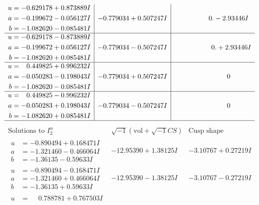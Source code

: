 \documentclass[1p]{elsarticle_modified}
\theoremstyle{definition}
\newcommand{\I}{\sqrt{-1}}
\begin{document}
$$\begin{array}{c|c|c}
\begin{aligned}
u &= -0.629178 + 0.873889 I \\
a &= -0.199672 - 0.056127 I \\
b &= -1.082620 - 0.085481 I\end{aligned}
 & -0.779034 + 0.507247 I & \phantom{-0.000000 } 0. - 2.93446 I \\ \hline\begin{aligned}
u &= -0.629178 - 0.873889 I \\
a &= -0.199672 + 0.056127 I \\
b &= -1.082620 + 0.085481 I\end{aligned}
 & -0.779034 - 0.507247 I & \phantom{-0.000000 -}0. + 2.93446 I \\ \hline\begin{aligned}
u &= \phantom{-}0.449825 + 0.996232 I \\
a &= -0.050283 - 0.198043 I \\
b &= -1.082620 - 0.085481 I\end{aligned}
 & -0.779034 + 0.507247 I & \phantom{-0.000000 } 0 \\ \hline\begin{aligned}
u &= \phantom{-}0.449825 - 0.996232 I \\
a &= -0.050283 + 0.198043 I \\
b &= -1.082620 + 0.085481 I\end{aligned}
 & -0.779034 - 0.507247 I & \phantom{-0.000000 } 0\\
 \hline 
 \end{array}$$\newpage$$\begin{array}{c|c|c}  
\text{Solutions to }I^u_{2}& \I (\text{vol} + \sqrt{-1}CS) & \text{Cusp shape}\\
 \hline 
\begin{aligned}
u &= -0.890494 + 0.168471 I \\
a &= -1.321460 - 0.466064 I \\
b &= -1.36135 - 0.59633 I\end{aligned}
 & -12.95390 + 1.38125 I & -3.10767 + 0.27219 I \\ \hline\begin{aligned}
u &= -0.890494 - 0.168471 I \\
a &= -1.321460 + 0.466064 I \\
b &= -1.36135 + 0.59633 I\end{aligned}
 & -12.95390 - 1.38125 I & -3.10767 - 0.27219 I \\ \hline\begin{aligned}
u &= \phantom{-}0.788781 + 0.767503 I \\

\end{aligned}
\end{array}$$
\end{document}
